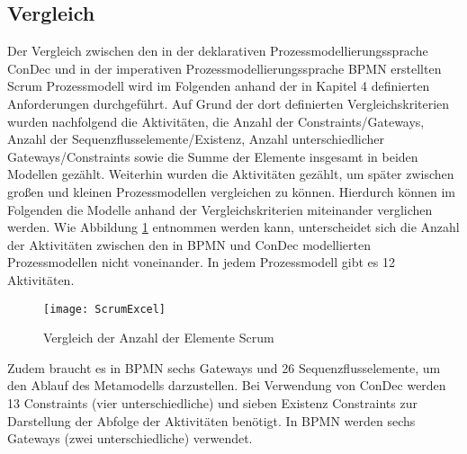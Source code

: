 \subsection{Vergleich}

Der Vergleich zwischen den in der deklarativen Prozessmodellierungssprache ConDec und in der imperativen Prozessmodellierungssprache BPMN erstellten Scrum Prozessmodell wird im Folgenden anhand der in Kapitel 4 definierten Anforderungen durchgeführt. Auf Grund der dort definierten Vergleichskriterien wurden nachfolgend die Aktivitäten, die Anzahl der Constraints/Gateways, Anzahl der Sequenzflusselemente/Existenz, Anzahl unterschiedlicher Gateways/Constraints sowie die Summe der Elemente insgesamt in beiden Modellen gezählt. Weiterhin wurden die Aktivitäten gezählt, um später zwischen großen und kleinen Prozessmodellen vergleichen zu können. Hierdurch können im Folgenden die Modelle anhand der Vergleichskriterien miteinander verglichen werden. \newline
Wie Abbildung \ref{fig:ScrumExcel} entnommen werden kann, unterscheidet sich die Anzahl der Aktivitäten zwischen den in BPMN und ConDec modellierten Prozessmodellen nicht voneinander. In jedem Prozessmodell gibt es 12 Aktivitäten.\newline

\begin{figure}[htp]
\begin{center}
  \texttt{[image: ScrumExcel]} %
  \caption{Vergleich der Anzahl der Elemente Scrum}
  \label{fig:ScrumExcel}
\end{center}
\end{figure}


Zudem braucht es in BPMN sechs Gateways und 26 Sequenzflusselemente, um den Ablauf des Metamodells darzustellen. Bei Verwendung von ConDec werden 13 Constraints (vier unterschiedliche) und sieben Existenz Constraints zur Darstellung der Abfolge der Aktivitäten benötigt. In BPMN werden sechs Gateways (zwei unterschiedliche) verwendet.\newline


